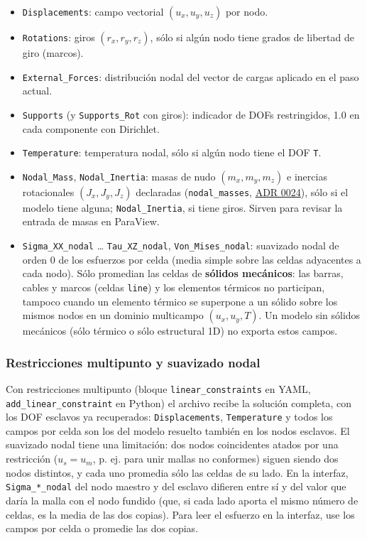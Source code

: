 \documentclass[11pt,oneside]{report}
\begin{document}
\begin{itemize}
  \item \texttt{Displacements}: campo vectorial $(u_x, u_y, u_z)$ por nodo.
  \item \texttt{Rotations}: giros $(r_x, r_y, r_z)$, sólo si algún nodo tiene grados de libertad de giro (marcos).
  \item \texttt{External\_Forces}: distribución nodal del vector de cargas aplicado en el paso actual.
  \item \texttt{Supports} (y \texttt{Supports\_Rot} con giros): indicador de DOFs restringidos, 1.0 en cada componente con Dirichlet.
  \item \texttt{Temperature}: temperatura nodal, sólo si algún nodo tiene el DOF \texttt{T}.
  \item \texttt{Nodal\_Mass}, \texttt{Nodal\_Inertia}: masas de nudo $(m_x, m_y, m_z)$ e inercias rotacionales $(J_x, J_y, J_z)$ declaradas (\texttt{nodal\_masses}, \href{https://github.com/jretamav/solidum-fem/blob/main/docs/adr/0024-masas-de-nudo-y-modal-con-dof-sin-masa.md}{ADR 0024}), sólo si el modelo tiene alguna; \texttt{Nodal\_Inertia}, si tiene giros. Sirven para revisar la entrada de masas en ParaView.
  \item \texttt{Sigma\_XX\_nodal} \ldots{} \texttt{Tau\_XZ\_nodal}, \texttt{Von\_Mises\_nodal}: suavizado nodal de orden 0 de los esfuerzos por celda (media simple sobre las celdas adyacentes a cada nodo). Sólo promedian las celdas de \textbf{sólidos mecánicos}: las barras, cables y marcos (celdas \texttt{line}) y los elementos térmicos no participan, tampoco cuando un elemento térmico se superpone a un sólido sobre los mismos nodos en un dominio multicampo $(u_x, u_y, T)$. Un modelo sin sólidos mecánicos (sólo térmico o sólo estructural 1D) no exporta estos campos.
\end{itemize}

\subsubsection{Restricciones multipunto y suavizado nodal}

Con restricciones multipunto (bloque \texttt{linear\_\allowbreak{}constraints} en YAML, \texttt{add\_\allowbreak{}linear\_\allowbreak{}constraint} en Python) el archivo recibe la solución completa, con los DOF esclavos ya recuperados: \texttt{Displacements}, \texttt{Temperature} y todos los campos por celda son los del modelo resuelto también en los nodos esclavos. El suavizado nodal tiene una limitación: dos nodos coincidentes atados por una restricción ($u_s = u_m$, p. ej. para unir mallas no conformes) siguen siendo dos nodos distintos, y cada uno promedia sólo las celdas de su lado. En la interfaz, \texttt{Sigma\_*\_nodal} del nodo maestro y del esclavo difieren entre sí y del valor que daría la malla con el nodo fundido (que, si cada lado aporta el mismo número de celdas, es la media de las dos copias). Para leer el esfuerzo en la interfaz, use los campos por celda o promedie las dos copias.
\end{document}
